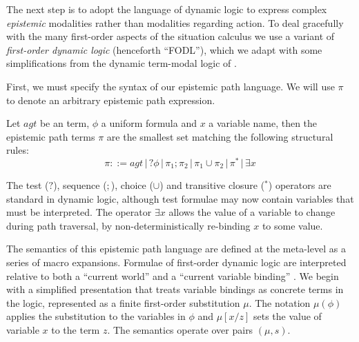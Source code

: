 The next step is to adopt the language of dynamic logic to express
complex \emph{epistemic} modalities rather than modalities regarding
action. To deal gracefully with the many first-order aspects of the
situation calculus we use a variant of \emph{first-order dynamic logic}
(henceforth {}``FODL''), which we adapt with some simplifications
from the dynamic term-modal logic of \citet{kooi07dyn_termmodal_logic}.

First, we must specify the syntax of our epistemic path language.
We will use $\pi$ to denote an arbitrary epistemic path expression.

\newpage{}

\begin{defnL}
 Let $agt$ be an term, $\phi$
a uniform formula and $x$ a variable name, then the epistemic path
terms $\pi$ are the smallest set matching the following structural
rules:\[
\pi::=agt\,|\,?\phi\,|\,\pi_{1};\pi_{2}\,|\,\pi_{1}\cup\pi_{2}\,|\,\pi^{*}\,|\,\exists x\]

\end{defnL}
The test ($?$), sequence ($;$), choice ($\cup$) and transitive
closure ($^{*}$) operators are standard in dynamic logic, although
test formulae may now contain variables that must be interpreted.
The operator $\exists x$ allows the value of a variable to change
during path traversal, by non-deterministically re-binding $x$ to
some value.

The semantics of this epistemic path language are defined at the meta-level
as a series of macro expansions. Formulae of first-order dynamic logic
are interpreted relative to both a {}``current world'' and a {}``current
variable binding'' \citep{kooi07dyn_termmodal_logic}. We begin with
a simplified presentation that treats variable bindings as concrete
terms in the logic, represented as a finite first-order substitution
$\mu$. The notation $\mu(\phi)$ applies the substitution to the
variables in $\phi$ and $\mu[x/z]$ sets the value of variable $x$
to the term $z$. The semantics operate over pairs $(\mu,s)$.

